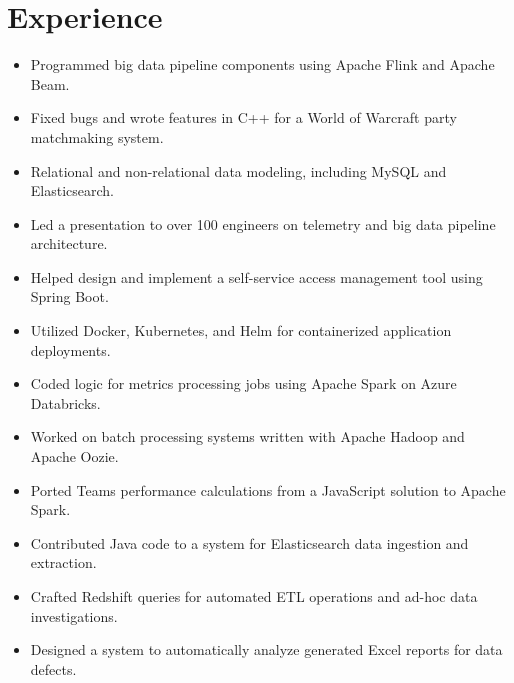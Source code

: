 \documentclass[letterpaper]{resume}
\begin{document}
\begin{minipage}[t]{0.74\columnwidth}


\section{Experience}

\vspace{2pt}
\begin{itemize}
\item Programmed big data pipeline components using Apache Flink and Apache Beam.
\item Fixed bugs and wrote features in C++ for a World of Warcraft party matchmaking system.
\item Relational and non-relational data modeling, including MySQL and Elasticsearch.
\item Led a presentation to over 100 engineers on telemetry and big data pipeline architecture.
\item Helped design and implement a self-service access management tool using Spring Boot.
\item Utilized Docker, Kubernetes, and Helm for containerized application deployments.
\end{itemize}

\sectionspace

\vspace{2pt}
\begin{itemize}
\item Coded logic for metrics processing jobs using Apache Spark on Azure Databricks.
\item Worked on batch processing systems written with Apache Hadoop and Apache Oozie.
\item Ported Teams performance calculations from a JavaScript solution to Apache Spark.
\end{itemize}

\sectionspace

\vspace{2pt}
\begin{itemize}
\item Contributed Java code to a system for Elasticsearch data ingestion and extraction.
\item Crafted Redshift queries for automated ETL operations and ad-hoc data investigations.
\item Designed a system to automatically analyze generated Excel reports for data defects.
\end{itemize}


\end{minipage}
\end{document}
